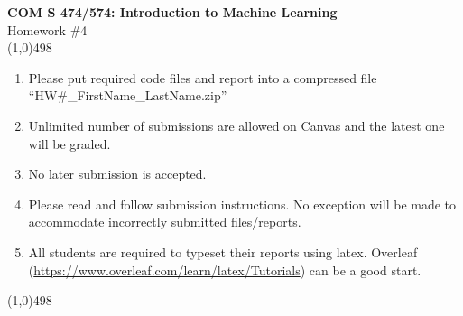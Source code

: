 \documentclass[11pt]{article}
\begin{document}
\begin{center}
    {\Large \textbf{COM S 474/574: Introduction to Machine Learning}\\Homework \#4}\\

    \linethickness{1mm}\line(1,0){498}

    \begin{enumerate}
        \item Please put required code files and report into a
              compressed file ``HW\#\_FirstName\_LastName.zip''
        \item Unlimited number of submissions are
              allowed on Canvas and the latest one will be graded.
        \item {\color{red} No later submission is accepted.}
        \item Please read and follow submission instructions. No exception
              will be made to accommodate incorrectly submitted files/reports.
        \item All students are required to typeset their reports using
              latex. Overleaf
              (\url{https://www.overleaf.com/learn/latex/Tutorials}) can be a
              good start.
    \end{enumerate}

    \linethickness{1mm}\line(1,0){498}

\end{center}


\end{document}
